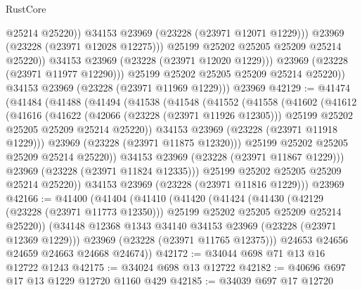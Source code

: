 \begin{lexlean}{RustCore}
\begin{coremodule}
                          @25214
                          @25220))
                      @34153
                      @23969
                      (@23228 (@23971 @12071 @1229)))
                    @23969
                    (@23228 (@23971 @12028 @12275)))
                  @25199
                  @25202
                  @25205
                  @25209
                  @25214
                  @25220))
              @34153
              @23969
              (@23228 (@23971 @12020 @1229)))
            @23969
            (@23228 (@23971 @11977 @12290)))
          @25199
          @25202
          @25205
          @25209
          @25214
          @25220))
      @34153
      @23969
      (@23228 (@23971 @11969 @1229)))
    @23969
@42129 := @41474
    (@41484
      (@41488
        (@41494
          (@41538
            (@41548
              (@41552
                (@41558
                  (@41602
                    (@41612
                      (@41616
                        (@41622
                          (@42066 (@23228 (@23971 @11926 @12305)))
                          @25199
                          @25202
                          @25205
                          @25209
                          @25214
                          @25220))
                      @34153
                      @23969
                      (@23228 (@23971 @11918 @1229)))
                    @23969
                    (@23228 (@23971 @11875 @12320)))
                  @25199
                  @25202
                  @25205
                  @25209
                  @25214
                  @25220))
              @34153
              @23969
              (@23228 (@23971 @11867 @1229)))
            @23969
            (@23228 (@23971 @11824 @12335)))
          @25199
          @25202
          @25205
          @25209
          @25214
          @25220))
      @34153
      @23969
      (@23228 (@23971 @11816 @1229)))
    @23969
@42166 := @41400
    (@41404
      (@41410
        (@41420
          (@41424
            (@41430
              (@42129 (@23228 (@23971 @11773 @12350)))
              @25199
              @25202
              @25205
              @25209
              @25214
              @25220))
          (@34148 @12368 @1343 @34140 @34153 @23969 (@23228 (@23971 @12369 @1229)))
          @23969
          (@23228 (@23971 @11765 @12375)))
        @24653
        @24656
        @24659
        @24663
        @24668
        @24674))
@42172 := @34044 @698 @71 @13 @16 @12722 @1243
@42175 := @34024 @698 @13 @12722
@42182 := @40696 @697 @17 @13 @1229 @12720 @1160 @429
@42185 := @34039 @697 @17 @12720

\end{coremodule}
\end{lexlean}
